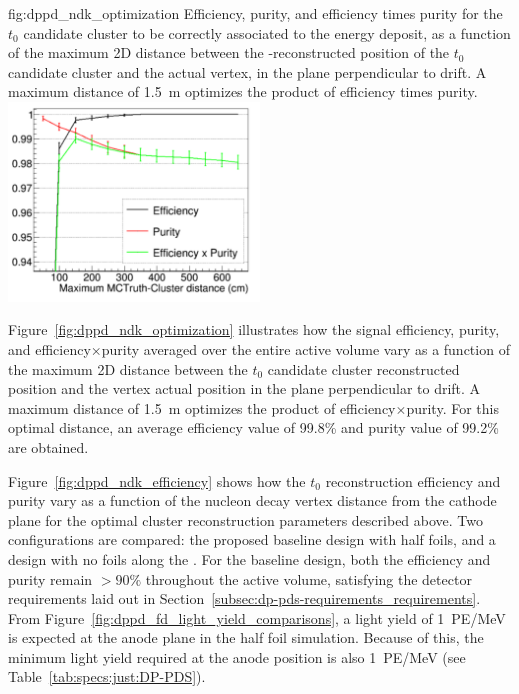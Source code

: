 \begin{dunefigure}{fig:dppd_ndk_optimization}
{Efficiency, purity, and efficiency times purity for the $t_0$ candidate cluster to be correctly associated to the  energy deposit, as a function of the maximum 2D distance between the -reconstructed position of the $t_0$ candidate cluster and the actual  vertex, in the plane perpendicular to drift. A maximum distance of \SI{1.5}{\m} optimizes the product of efficiency times purity.}
\includegraphics[width=0.5\textwidth]{graphics/dppd_ndk_optimization.pdf}
\end{dunefigure}

Figure~\ref{fig:dppd_ndk_optimization} illustrates how the  signal efficiency, purity, and efficiency$\times$purity averaged over the entire  active volume vary as a function of the maximum 2D distance between the $t_0$ candidate cluster reconstructed position and the  vertex actual position in the plane perpendicular to drift. A maximum distance of \SI{1.5}{\m} optimizes the product of efficiency$\times$purity. For this optimal distance, an average efficiency value of \num{99.8}\% and purity value of \num{99.2}\% are obtained.  

Figure~\ref{fig:dppd_ndk_efficiency} shows how the  $t_0$ reconstruction efficiency and purity vary as a function of the nucleon decay vertex distance from the cathode plane for the optimal cluster reconstruction parameters described above. Two configurations are compared: the proposed baseline design with half foils, and a design with no foils along the . For the baseline design, both the efficiency and purity remain $>90\%$ throughout the  active volume, satisfying the detector requirements laid out in Section~\ref{subsec:dp-pds-requirements_requirements}. From Figure~\ref{fig:dppd_fd_light_yield_comparisons}, a light yield of \SI{1}{PE/\MeV} is expected at the anode plane in the half foil simulation. Because of this, the  minimum light yield required at the anode position is also \SI{1}{PE/\MeV} (see Table~\ref{tab:specs:just:DP-PDS}). 


